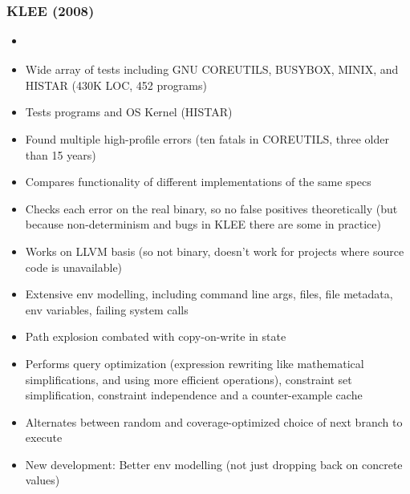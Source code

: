 \documentclass[12pt]{article}
\begin{document}
\subsubsection{KLEE (2008)}
\begin{itemize}
    \item \cite{KLEE}
    \item Wide array of tests including GNU COREUTILS, BUSYBOX, MINIX, and HISTAR (430K LOC, 452 programs)
    \item Tests programs and OS Kernel (HISTAR)
    \item Found multiple high-profile errors (ten fatals in COREUTILS, three older than 15 years)
    \item Compares functionality of different implementations of the same specs
    \item Checks each error on the real binary, so no false positives theoretically (but because non-determinism and bugs in KLEE there are some in practice)
    \item Works on LLVM basis (so not binary, doesn't work for projects where source code is unavailable)
    \item Extensive env modelling, including command line args, files, file metadata, env variables, failing system calls
    \item Path explosion combated with copy-on-write in state
    \item Performs query optimization (expression rewriting like mathematical simplifications, and using more efficient operations), constraint set simplification, constraint independence and a counter-example cache
    \item Alternates between random and coverage-optimized choice of next branch to execute
    \item New development: Better env modelling (not just dropping back on concrete values)
\end{itemize}



\end{document}
